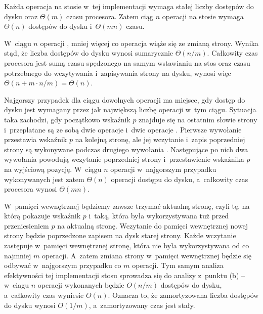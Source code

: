 
\subproblem %
Każda operacja na stosie w~tej implementacji wymaga stałej liczby dostępów do dysku oraz $\Theta(m)$ czasu procesora.
Zatem ciąg $n$ operacji na stosie wymaga $\Theta(n)$ dostępów do dysku i~$\Theta(mn)$ czasu.

\subproblem %
W~ciągu $n$ operacji , mniej więcej co  operacja wiąże się ze zmianą strony.
Wynika stąd, że liczba dostępów do dysku wynosi sumarycznie $\Theta(n/m)$.
Całkowity czas procesora jest sumą czasu spędzonego na samym wstawianiu na stos oraz czasu potrzebnego do wczytywania i~zapisywania strony na dysku, wynosi więc $\Theta(n+m\cdot n/m)=\Theta(n)$.

\subproblem %
Najgorszy przypadek dla ciągu dowolnych operacji ma miejsce, gdy dostęp do dysku jest wymagany przez jak największą liczbę operacji w~tym ciągu.
Sytuacja taka zachodzi, gdy początkowo wskaźnik $p$ znajduje się na ostatnim słowie strony i~przeplatane są ze sobą dwie operacje  i~dwie operacje .
Pierwsze wywołanie  przestawia wskaźnik $p$ na kolejną stronę, ale jej wczytanie i~zapis poprzedniej strony są wykonywane podczas drugiego wywołania .
Następujące po nich dwa wywołania  powodują wczytanie poprzedniej strony i~przestawienie wskaźnika $p$ na wyjściową pozycję.
W~ciągu $n$ operacji w~najgorszym przypadku wykonywanych jest zatem $\Theta(n)$ operacji dostępu do dysku, a~całkowity czas procesora wynosi $\Theta(mn)$.

\subproblem %
W~pamięci wewnętrznej będziemy zawsze trzymać aktualną stronę, czyli tę, na którą pokazuje wskaźnik $p$ i~taką, która była wykorzystywana tuż przed przeniesieniem $p$ na aktualną stronę.
Wczytanie do pamięci wewnętrznej nowej strony będzie poprzedzone zapisem na dysk starej strony.
Każde wczytanie zastępuje w~pamięci wewnętrznej stronę, która nie była wykorzystywana od co najmniej $m$ operacji.
A~zatem zmiana strony w~pamięci wewnętrznej będzie się odbywać w~najgorszym przypadku co $m$ operacji.
Tym samym analiza efektywności tej implementacji stosu sprowadza się do analizy z~punktu (b) -- w~ciagu $n$ operacji wykonanych będzie $O(n/m)$ dostępów do dysku, a~całkowity czas wyniesie $O(n)$.
Oznacza to, że zamortyzowana liczba dostępów do dysku wynosi $O(1/m)$, a~zamortyzowany czas jest stały.
